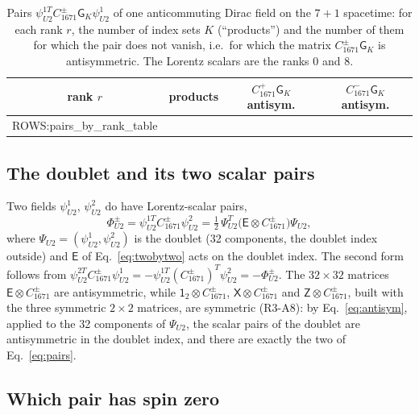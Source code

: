 \begin{table}[t]
\caption{Pairs $\psi^{1T}_{U2}C^\pm_{1671}\mathsf G_K\psi^1_{U2}$ of one anticommuting Dirac field on
the $7+1$ spacetime: for each rank $r$, the number of index sets $K$ (``products'') and the number
of them for which the pair does not vanish, i.e.\ for which the matrix $C^\pm_{1671}\mathsf G_K$
is antisymmetric. The Lorentz scalars are the ranks 0 and 8.}
\label{tab:pairs}
\begin{ruledtabular}
\begin{tabular}{cccc}
rank $r$ & products & $C^+_{1671}\mathsf G_K$ antisym. & $C^-_{1671}\mathsf G_K$ antisym.\\
\hline
{{ROWS:pairs_by_rank_table}}
\end{tabular}
\end{ruledtabular}
\end{table}

\subsection{The doublet and its two scalar pairs}

Two fields $\psi^1_{U2}$, $\psi^2_{U2}$ do have Lorentz-scalar pairs,
\begin{equation}
\Phi^\pm_{U2}=\psi^{1T}_{U2}C^\pm_{1671}\psi^2_{U2}
=\tfrac12\,\Psi^T_{U2}\big(\mathsf E\otimes C^\pm_{1671}\big)\Psi_{U2},
\label{eq:pairs}
\end{equation}
where $\Psi_{U2}=(\psi^1_{U2},\psi^2_{U2})$ is the doublet (32 components, the doublet index
outside) and $\mathsf E$ of Eq.~\eqref{eq:twobytwo} acts on the doublet index. The second form
follows from $\psi^{2T}_{U2}C^\pm_{1671}\psi^1_{U2}=-\psi^{1T}_{U2}(C^\pm_{1671})^T\psi^2_{U2}
=-\Phi^\pm_{U2}$. The $32\times32$ matrices $\mathsf E\otimes C^\pm_{1671}$ are antisymmetric,
while $\mathsf 1_2\otimes C^\pm_{1671}$, $\mathsf X\otimes C^\pm_{1671}$ and $\mathsf Z\otimes C^\pm_{1671}$,
built with the three symmetric $2\times2$ matrices, are symmetric (R3-A8): by Eq.~\eqref{eq:antisym}, applied to
the 32 components of $\Psi_{U2}$, the scalar pairs of the doublet are antisymmetric in the doublet
index, and there are exactly the two of Eq.~\eqref{eq:pairs}.

\subsection{Which pair has spin zero}

